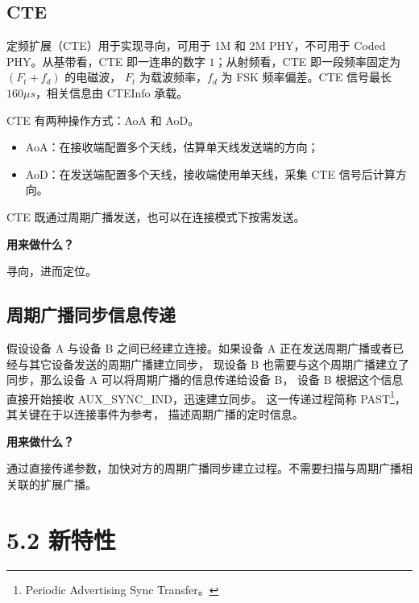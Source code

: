 \documentclass[
  12pt,
]{book}
\makeatletter
\newenvironment{kframe}{%
\medskip{}
\setlength{\fboxsep}{.8em}
 \def\at@end@of@kframe{}%
 \ifinner\ifhmode%
  \def\at@end@of@kframe{\end{minipage}}%
  \begin{minipage}{\columnwidth}%
 \fi\fi%
 \def\FrameCommand##1{\hskip\@totalleftmargin \hskip-\fboxsep
 \colorbox{shadecolor}{##1}\hskip-\fboxsep
     \hskip-\linewidth \hskip-\@totalleftmargin \hskip\columnwidth}%
 \MakeFramed {\advance\hsize-\width
   \@totalleftmargin\z@ \linewidth\hsize
   \@setminipage}}%
 {\par\unskip\endMakeFramed%
 \at@end@of@kframe}
\newenvironment{rmdblock}[1]
  {
  \begin{itemize}
  \renewcommand{\labelitemi}{
    \raisebox{-.7\height}[0pt][0pt]{
      {\setkeys{Gin}{width=3em,keepaspectratio}\texttt{[image: images/\#1]}}
    }
  }
  \setlength{\fboxsep}{1em}
  \begin{kframe}
  \item
  }
  {
  \end{kframe}
  \end{itemize}
  }
\newenvironment{rmdnote}
  {\begin{rmdblock}{note}}
  {\end{rmdblock}}
\makeatother
\begin{document}
\hypertarget{cte}{%
\subsection{CTE}\label{cte}}

定频扩展（CTE）用于实现寻向，可用于 1M 和 2M PHY，不可用于 Coded PHY。从基带看，CTE
即一连串的数字 \(1\)；从射频看，CTE 即一段频率固定为 \((F_t + f_d)\) 的电磁波，
\(F_t\) 为载波频率，\(f_d\) 为 FSK 频率偏差。CTE 信号最长 \(160\mu s\)，相关信息由 CTEInfo 承载。

CTE 有两种操作方式：AoA 和 AoD。

\begin{itemize}
\item
  AoA：在接收端配置多个天线，估算单天线发送端的方向；
\item
  AoD：在发送端配置多个天线，接收端使用单天线，采集 CTE 信号后计算方向。
\end{itemize}

CTE 既通过周期广播发送，也可以在连接模式下按需发送。

\begin{rmdnote}
\textbf{用来做什么？}

寻向，进而定位。
\end{rmdnote}

\hypertarget{ch-feature-prd-transfer}{%
\subsection{周期广播同步信息传递}\label{ch-feature-prd-transfer}}

假设设备 A 与设备 B 之间已经建立连接。如果设备 A 正在发送周期广播或者已经与其它设备发送的周期广播建立同步，
现设备 B 也需要与这个周期广播建立了同步，那么设备 A 可以将周期广播的信息传递给设备 B，
设备 B 根据这个信息直接开始接收 AUX\_SYNC\_IND，迅速建立同步。
这一传递过程简称 PAST\footnote{Periodic Advertising Sync Transfer。}，其关键在于以连接事件为参考，
描述周期广播的定时信息。

\begin{rmdnote}
\textbf{用来做什么？}

通过直接传递参数，加快对方的周期广播同步建立过程。不需要扫描与周期广播相关联的扩展广播。
\end{rmdnote}

\hypertarget{ux65b0ux7279ux6027-2}{%
\section{5.2 新特性}\label{ux65b0ux7279ux6027-2}}
\end{document}
